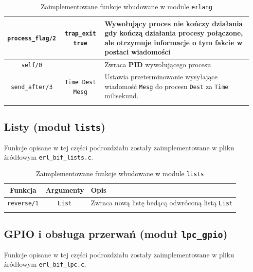 \begin{longtable}{|c|c|p{7.5cm}|}
\hline
\texttt{process\_flag/2} & \texttt{trap\_exit true} & Wywołujący proces nie kończy działania gdy kończą działania procesy połączone, ale otrzymuje informacje o tym fakcie w postaci wiadomości \\
\hline
\texttt{self/0} & & Zwraca \textbf{PID} wywołującego procesu \\
\hline
\texttt{send\_after/3} & \texttt{Time Dest Mesg} & Ustawia przeterminowanie wysyłające wiadomość \texttt{Mesg} do procesu \texttt{Dest} za \texttt{Time} milisekund. \\
\hline
\caption{Zaimplementowane funkcje wbudowane w module \texttt{erlang}} 
\label{table:bifErlang} \\
\end{longtable}


\subsection{Listy (moduł \texttt{lists})}
\label{sub:bifLists}

Funkcje opisane w tej części podrozdziału zostały zaimplementowane w pliku źródłowym \texttt{erl\_bif\_lists.c}.

\begin{longtable}{|c|c|p{8cm}|}
\hline

Funkcja & Argumenty & Opis \\
\endfirsthead
\hline
\texttt{reverse/1} & \texttt{List} & Zwraca nową listę bedącą odwróconą listą \texttt{List} \\
\hline
\caption{Zaimplementowane funkcje wbudowane w module \texttt{lists}} 
\label{table:bifLists} \\
\end{longtable}

\subsection{GPIO i obsługa przerwań (moduł \texttt{lpc\_gpio})}
\label{sub:bifGPIO}
Funkcje opisane w tej części podrozdziału zostały zaimplementowane w pliku źródłowym \texttt{erl\_bif\_lpc.c}.

